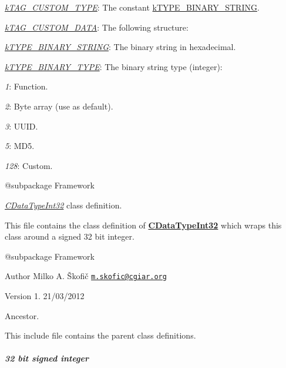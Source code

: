 \begin{DoxyItemize}
\item {\itshape \hyperlink{}{k\-T\-A\-G\-\_\-\-C\-U\-S\-T\-O\-M\-\_\-\-T\-Y\-P\-E}}\-: The constant \hyperlink{}{k\-T\-Y\-P\-E\-\_\-\-B\-I\-N\-A\-R\-Y\-\_\-\-S\-T\-R\-I\-N\-G}. 
\item {\itshape \hyperlink{}{k\-T\-A\-G\-\_\-\-C\-U\-S\-T\-O\-M\-\_\-\-D\-A\-T\-A}}\-: The following structure\-: 
\begin{DoxyItemize}
\item {\itshape \hyperlink{}{k\-T\-Y\-P\-E\-\_\-\-B\-I\-N\-A\-R\-Y\-\_\-\-S\-T\-R\-I\-N\-G}}\-: The binary string in hexadecimal. 
\item {\itshape \hyperlink{}{k\-T\-Y\-P\-E\-\_\-\-B\-I\-N\-A\-R\-Y\-\_\-\-T\-Y\-P\-E}}\-: The binary string type (integer)\-: 
\begin{DoxyItemize}
\item {\itshape 1}\-: Function. 
\item {\itshape 2}\-: Byte array (use as default). 
\item {\itshape 3}\-: U\-U\-I\-D. 
\item {\itshape 5}\-: M\-D5. 
\item {\itshape 128}\-: Custom. 
\end{DoxyItemize}
\end{DoxyItemize}
\end{DoxyItemize}

\begin{DoxyVerb} @subpackage        Framework\end{DoxyVerb}


{\itshape \hyperlink{class_c_data_type_int32}{C\-Data\-Type\-Int32}} class definition.

This file contains the class definition of {\bfseries \hyperlink{class_c_data_type_int32}{C\-Data\-Type\-Int32}} which wraps this class around a signed 32 bit integer.

\begin{DoxyVerb} @subpackage        Framework
\end{DoxyVerb}


\begin{DoxyAuthor}{Author}
Milko A. Škofič \href{mailto:m.skofic@cgiar.org}{\tt m.\-skofic@cgiar.\-org} 
\end{DoxyAuthor}
\begin{DoxyVersion}{Version}
1. 21/03/2012
\end{DoxyVersion}
Ancestor.

This include file contains the parent class definitions. \subparagraph*{32 bit signed integer}

